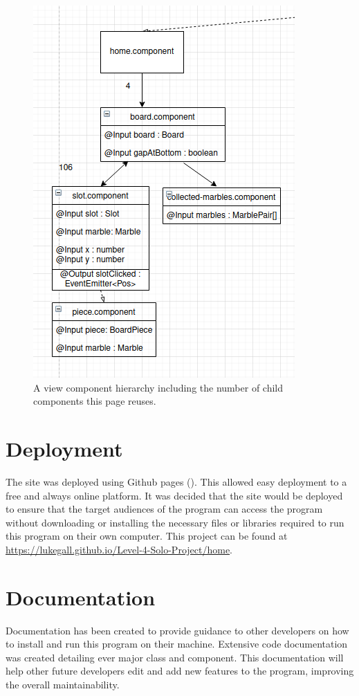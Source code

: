 \documentclass{l4proj}
\begin{document}
\begin{figure}
    \centering
    \includegraphics[width=0.45\linewidth]{images/homeComponent.png}
    \caption{A view component hierarchy including the number of child components this page reuses.}
    \label{fig:homeComponent}
\end{figure}

\section{Deployment}
The site was deployed using Github pages (\cite{github_pages}). This allowed easy deployment to a free and always online platform. It was decided that the site would be deployed to ensure that the target audiences of the program can access the program without downloading or installing the necessary files or libraries required to run this program on their own computer. This project can be found at \url{https://lukegall.github.io/Level-4-Solo-Project/home}.

\section{Documentation}
Documentation has been created to provide guidance to other developers on how to install and run this program on their machine. Extensive code documentation was created detailing ever major class and component. This documentation will help other future developers edit and add new features to the program, improving the overall maintainability.
\end{document}
